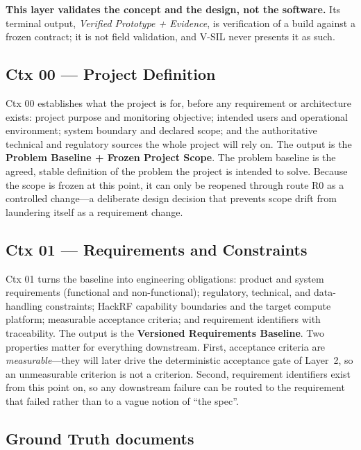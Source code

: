 \documentclass[11pt,a4paper]{article}
\begin{document}
\textbf{This layer validates the concept and the design, not the software.} Its terminal output,
\emph{Verified Prototype + Evidence}, is verification of a build against a frozen contract; it is
not field validation, and V-SIL never presents it as such.

\subsection{Ctx 00 --- Project Definition}
\label{sec:ctx00}

Ctx 00 establishes what the project is for, before any requirement or architecture exists:
project purpose and monitoring objective; intended users and operational environment; system
boundary and declared scope; and the authoritative technical and regulatory sources the whole
project will rely on. The output is the \textbf{Problem Baseline + Frozen Project Scope}. The
problem baseline is the agreed, stable definition of the problem the project is intended to
solve. Because the scope is frozen at this point, it can only be reopened through route R0 as a
controlled change---a deliberate design decision that prevents scope drift from laundering
itself as a requirement change.

\subsection{Ctx 01 --- Requirements and Constraints}
\label{sec:ctx01}

Ctx 01 turns the baseline into engineering obligations: product and system requirements
(functional and non-functional); regulatory, technical, and data-handling constraints; HackRF
capability boundaries and the target compute platform; measurable acceptance criteria; and
requirement identifiers with traceability. The output is the \textbf{Versioned Requirements
Baseline}. Two properties matter for everything downstream. First, acceptance criteria are
\emph{measurable}---they will later drive the deterministic acceptance gate of Layer~2, so an
unmeasurable criterion is not a criterion. Second, requirement identifiers exist from this point
on, so any downstream failure can be routed to the requirement that failed rather than to a
vague notion of ``the spec''.

\subsection{Ground Truth documents}
\label{sec:gt}
\end{document}
